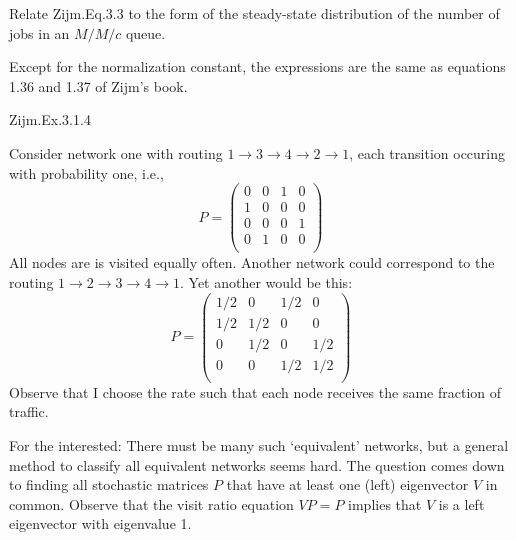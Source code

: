 \begin{question}
  Relate Zijm.Eq.3.3 to the form of the steady-state distribution of
  the number of jobs in an $M/M/c$ queue.
  \begin{solution}
    Except for the normalization constant, the expressions are the
    same as equations 1.36 and 1.37 of Zijm's book.
  \end{solution}
\end{question}

\begin{question}
Zijm.Ex.3.1.4
\begin{solution}
Consider network one with routing $1\to3\to4\to2\to1$, each transition occuring with probability one, i.e.,
\begin{equation*}
  P =
  \begin{pmatrix}
    0 & 0 & 1 & 0  \\
    1 & 0 & 0 & 0  \\
    0 & 0 & 0 & 1  \\
    0 & 1 & 0 & 0  \\
  \end{pmatrix}
\end{equation*}
All nodes are is visited equally often. Another network could correspond to the routing $1\to2\to3\to4\to1$.  Yet another would be this:
\begin{equation*}
  P =
  \begin{pmatrix}
    1/2 & 0   & 1/2 & 0  \\
    1/2 & 1/2 & 0 & 0  \\
    0   & 1/2 & 0 & 1/2  \\
    0   & 0   & 1/2 & 1/2  \\
  \end{pmatrix}
\end{equation*}
Observe that I choose the rate such that each node receives the same
fraction of traffic.

For the interested: There must be many such `equivalent' networks, but
a general method to classify all equivalent networks seems hard. The
question comes down to finding all stochastic matrices $P$ that have
at least one (left) eigenvector $V$ in common. Observe that the visit
ratio equation $VP=P$ implies that $V$ is a left eigenvector with
eigenvalue 1.
\end{solution}
\end{question}

